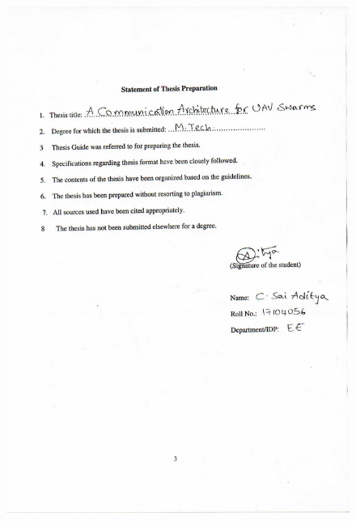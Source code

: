 \documentclass[11pt, a4paper, oneside]{Thesis} %
\begin{document}
\begin{figure}
	\centering
	\includegraphics[scale=0.9]{thesisStatement.pdf}
\end{figure}
\clearpage

%


\end{document}
